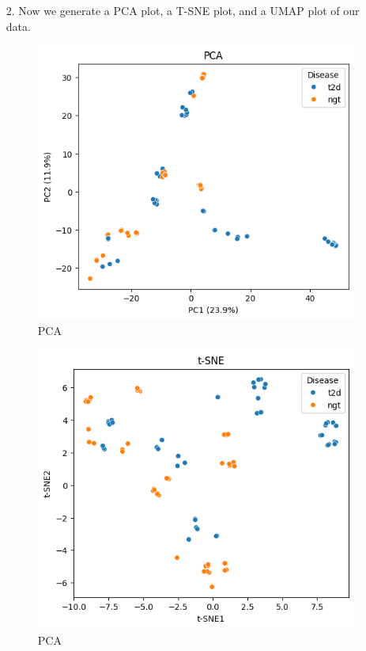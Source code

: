 \documentclass[12pt]{exam}
\begin{document}
\begin{itemize}
\item [2.] Now we generate a PCA plot, a T-SNE plot, and a UMAP plot of our data.
	\begin{figure}[h]
\centering
\includegraphics[scale=0.65]{figure_2_pca.png}
\caption{PCA}
\label{fig:pca plot}
\end{figure}
	\begin{figure}[h]
\centering
\includegraphics[scale=0.65]{figure_3_tsne.png}
\caption{PCA}

\end{figure}
\end{itemize}
\end{document}
